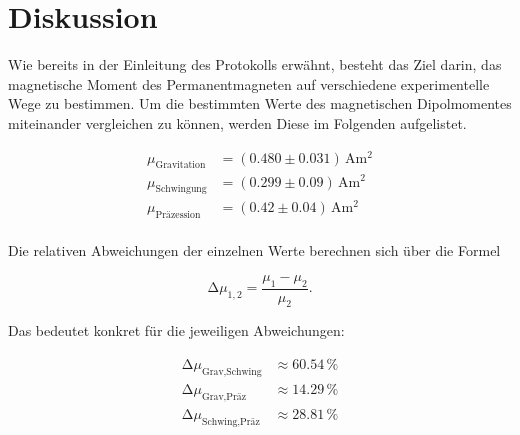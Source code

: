 


\section{Diskussion}
\label{sec:Diskussion}

Wie bereits in der Einleitung des Protokolls erwähnt, besteht das Ziel darin, das magnetische Moment des Permanentmagneten
auf verschiedene experimentelle Wege zu bestimmen. Um die bestimmten Werte des magnetischen Dipolmomentes miteinander 
vergleichen zu können, werden Diese im Folgenden aufgelistet.

\begin{align*}
    \mu_\text{Gravitation} &= \left(0.480 \pm 0.031\right)\,\unit{\ampere\meter\squared} \\
    \mu_\text{Schwingung} &= \left(0.299 \pm 0.09\right)\,\unit{\ampere\meter\squared} \\
    \mu_\text{Präzession} &= \left(0.42 \pm 0.04\right)\,\unit{\ampere\meter\squared} \\
\end{align*}

\noindent Die relativen Abweichungen der einzelnen Werte berechnen sich über die Formel 

\begin{equation*}
    \increment\mu_{1,2} = \frac{\mu_1 - \mu_2}{\mu_2}.
\end{equation*}

\noindent Das bedeutet konkret für die jeweiligen Abweichungen:

\begin{align*}
    \increment\mu_\text{Grav,Schwing} &\approx 60.54\,\unit{\percent} \\
    \increment\mu_\text{Grav,Präz} &\approx 14.29\,\unit{\percent} \\
    \increment\mu_\text{Schwing,Präz} &\approx 28.81\,\unit{\percent} \\
\end{align*}


